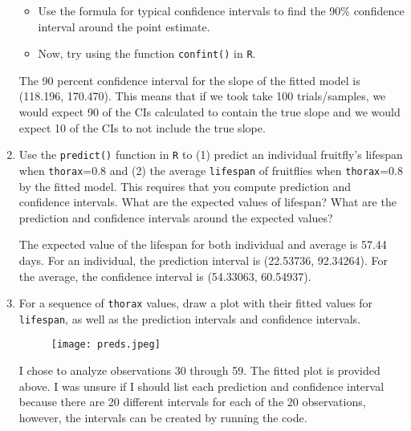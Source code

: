 \documentclass[12pt,letterpaper]{article}
\begin{document}
\begin{enumerate}
			\vspace{.5cm}
	\begin{itemize}
		\item
		Use the formula for typical confidence intervals to find the 90\% confidence interval around the point estimate.		\vspace{.5cm}
		\item
		Now, try using the function  \texttt{confint()}  in \texttt{R}.
	\end{itemize}
	
\noindent The 90 percent confidence interval for the slope of the fitted model is (118.196, 170.470). This means that if we took take 100 trials/samples, we would expect 90 of the CIs calculated to contain the true slope and we would expect 10 of the CIs to not include the true slope.
			\vspace{1cm}
			
	\item Use the \texttt{predict()} function in \texttt{R} to (1) predict an individual fruitfly's lifespan when \texttt{thorax}=0.8 and (2) the average \texttt{lifespan} of fruitflies when \texttt{thorax}=0.8 by the fitted model. This requires that you compute prediction and confidence intervals. What are the expected values of lifespan? What are the prediction and confidence intervals around the expected values? 
	

\noindent The expected value of the lifespan for both individual and average is 57.44 days. For an individual, the prediction interval is (22.53736, 92.34264). For the average, the confidence interval is (54.33063, 60.54937).
			\vspace{3cm}
			
	\item	For a sequence of \texttt{thorax} values, draw a plot with their fitted values for \texttt{lifespan}, as well as the prediction intervals and confidence intervals.

\begin{figure} [H]
	\texttt{[image: preds.jpeg]}
\end{figure}
\noindent I chose to analyze observations 30 through 59. The fitted plot is provided above. I was unsure if I should list each prediction and confidence interval because there are 20 different intervals for each of the 20 observations, however, the intervals can be created by running the code.



\end{enumerate}
\end{document}
